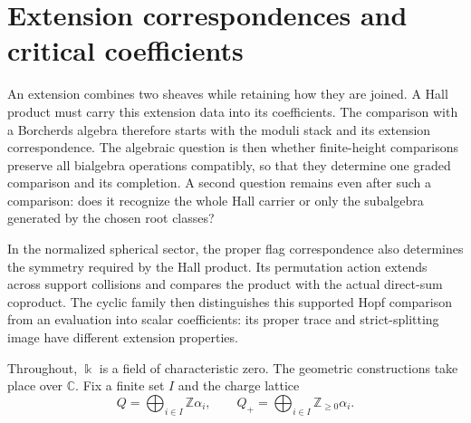 \documentclass[11pt]{article}
\newcommand{\kk}{\Bbbk}
\begin{document}
\begin{abstract}
primitives and commutes with cohomology. We contrast this with explicit
failures for general differential graded Hopf algebras and quotients,
and construct the ordered bar comparison with Lie chains.
For a quadratic surface algebra, we compute the full space of
differential classes and classify every central cocycle of ordinary
$\mathfrak{sl}_2$ currents with fixed trace pairing. A $22$-dimensional
nonzero quadratic coefficient space has $231$ central directions; the
positive-current specialization has explicit smaller images and kernels.
Broader reduced critical coefficients, independent field or
Ran-space realizations, full-current recognition, and state or
amplitude comparisons retain their separate hypotheses.
\end{abstract}

\section{Extension correspondences and critical coefficients}
\label{sec:compact-geometry}

An extension combines two sheaves while retaining how they are joined.
A Hall product must carry this extension data into its coefficients.
The comparison with a Borcherds algebra therefore starts with the moduli
stack and its extension correspondence.
The algebraic question is then whether finite-height comparisons preserve
all bialgebra operations compatibly, so that they determine one graded
comparison and its completion. A second question remains even after such
a comparison: does it recognize the whole Hall carrier or only the
subalgebra generated by the chosen root classes?

In the normalized spherical sector, the proper flag correspondence
also determines the symmetry required by the Hall product.
Its permutation action extends across support collisions and
compares the product with the actual direct-sum coproduct.
The cyclic family then distinguishes this supported Hopf
comparison from an evaluation into scalar coefficients: its
proper trace and strict-splitting image have different extension
properties.

Throughout, $\kk$ is a field of characteristic zero.
The geometric constructions take place over $\mathbb C$.
Fix a finite set $I$ and the charge lattice
\[
 Q=\bigoplus_{i\in I}\mathbb Z\alpha_i,\qquad
 Q_+=\bigoplus_{i\in I}\mathbb Z_{\geq0}\alpha_i.
\]
\end{document}
